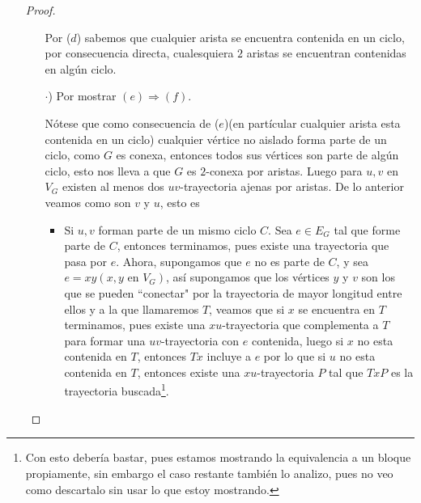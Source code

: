 \documentclass{article}
\begin{document}
\begin{enumerate}
\begin{proof}
\begin{itemize}
                        Por ($d$) sabemos que cualquier arista se encuentra
                        contenida en un ciclo, por consecuencia directa,
                        cualesquiera $2$ aristas se encuentran contenidas en
                        algún ciclo.

                    \item[$\cdot$)] Por mostrar $(e) \Rightarrow (f)$.

                        Nótese que como consecuencia de ($e$)(en partícular
                        cualquier arista esta contenida en un ciclo)
                        cualquier vértice no aislado forma parte de un ciclo,
                        como $G$ es conexa, entonces todos sus vértices son
                        parte de algún ciclo, esto nos lleva a que $G$ es
                        $2$-conexa por aristas. Luego para $u,v$ en $V_G$
                        existen al menos dos $uv$-trayectoria ajenas por
                        aristas. De lo anterior veamos como son $v$ y $u$,
                        esto es

                        \begin{itemize}
                            \item Si $u, v$ forman parte de un mismo ciclo $C$.
                                Sea $e \in E_G$ tal que forme parte de $C$, entonces
                                terminamos, pues existe una trayectoria que pasa por
                                $e$. Ahora, supongamos que $e$ no es parte de $C$, y
                                sea $e = xy (x, y \text{ en } V_G)$, así supongamos que
                                los vértices $y$ y $v$ son los que se pueden ``conectar"
                                por la trayectoria de mayor longitud entre ellos y a la
                                que llamaremos $T$, veamos que si $x$ se encuentra en $T$
                                terminamos, pues existe una $xu$-trayectoria que complementa
                                a $T$ para formar una $uv$-trayectoria con $e$ contenida, luego
                                si $x$ no esta contenida en $T$, entonces $Tx$ incluye a $e$ por
                                lo que si $u$ no esta contenida en $T$, entonces existe una
                                $xu$-trayectoria $P$ tal que $TxP$ es la trayectoria buscada\footnote{
                                  Con esto debería bastar, pues estamos mostrando la equivalencia
                                  a un bloque propiamente, sin embargo el caso restante también
                                  lo analizo, pues no veo como descartalo sin usar lo que estoy
                                  mostrando.}.


\end{itemize}
\end{itemize}
\end{proof}
\end{enumerate}
\end{document}
